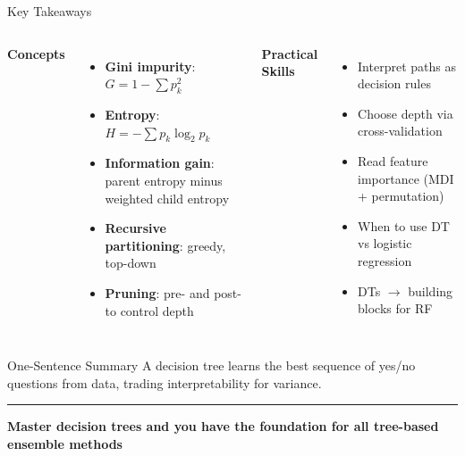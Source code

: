 \documentclass[8pt,aspectratio=169]{beamer}
\newcommand{\bottomnote}[1]{%
\vfill
\vspace{-2mm}
\textcolor{mllavender2}{\rule{\textwidth}{0.4pt}}
\vspace{1mm}
\footnotesize
\textbf{#1}
}
\newenvironment{compactlist}{%
  \begin{itemize}%
    \setlength{\itemsep}{2pt}%
    \setlength{\parskip}{0pt}%
    \setlength{\parsep}{0pt}%
}{%
  \end{itemize}%
}
\newcommand{\highlight}[1]{\textcolor{mlorange}{\textbf{#1}}}
\begin{document}
\begin{frame}[t]{Key Takeaways}
\small
\begin{columns}[T]
\textbf{Concepts}
\begin{compactlist}
\item \footnotesize \highlight{Gini impurity}: $G = 1 - \sum p_k^2$
\item \footnotesize \highlight{Entropy}: $H = -\sum p_k \log_2 p_k$
\item \footnotesize \highlight{Information gain}: parent entropy minus weighted child entropy
\item \footnotesize \highlight{Recursive partitioning}: greedy, top-down
\item \footnotesize \highlight{Pruning}: pre- and post- to control depth
\end{compactlist}

\textbf{Practical Skills}
\begin{compactlist}
\item \footnotesize Interpret paths as decision rules
\item \footnotesize Choose depth via cross-validation
\item \footnotesize Read feature importance (MDI + permutation)
\item \footnotesize When to use DT vs logistic regression
\item \footnotesize DTs $\to$ building blocks for RF
\end{compactlist}
\end{columns}
\vspace{3mm}
\begin{block}{One-Sentence Summary}
\footnotesize A decision tree learns the best sequence of yes/no questions from data, trading interpretability for variance.
\end{block}
\bottomnote{Master decision trees and you have the foundation for all tree-based ensemble methods}
\end{frame}
\end{document}
